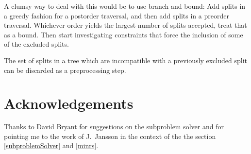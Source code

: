 \documentclass[11pt]{article}
\begin{document}
A clumsy way to deal with this would be to use branch and bound:  Add splits in a greedy fashion for a postorder traversal, and then add splits in a preorder traversal.
Whichever order yields the largest number of splits accepted, treat that as a bound.
Then start investigating constraints that force the inclusion of some of the excluded splits.

The set of splits in a tree which are incompatible with a previously excluded split can be discarded as a preprocessing step.

\section{Acknowledgements}
Thanks to David Bryant for suggestions on the subproblem solver and
    for pointing me to the work of J.~Jansson in the context of the 
    the section \ref{subproblemSolver} and \ref{minrs}.




\end{document}
